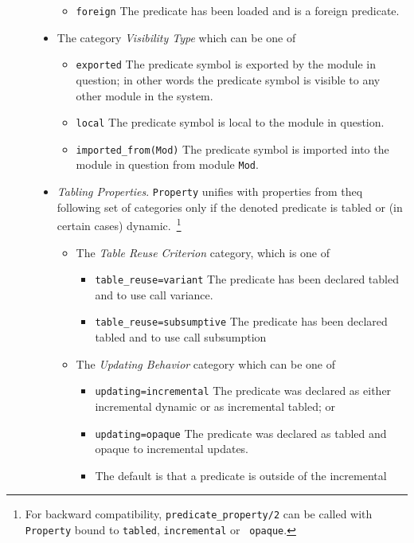 \begin{description}
\begin{itemize}
\begin{itemize}
\item{\tt foreign} The predicate has been loaded and is a foreign
  predicate.
%
\end{itemize}
%
\item The category {\em Visibility Type} which can be one of
\begin{itemize}
\item{\tt exported} The predicate symbol is exported by the module in
  question; in other words the predicate symbol is visible to any
  other module in the system.
%
\item{\tt local} The predicate symbol is local to the module in
  question.
%
\item{\tt imported\_from(Mod)} The predicate symbol is imported into
  the module in question from module {\tt Mod}.
%
\end{itemize}
\item{\em Tabling Properties}.  {\tt Property} unifies with properties
  from theq following set of categories only if the denoted predicate
  is tabled or (in certain cases) dynamic.~\footnote{For backward
    compatibility, {\tt predicate\_property/2} can be called with {\tt
      Property} bound to {\tt tabled}, {\tt incremental} or {\tt
      opaque}.}
%
\begin{itemize}
\item The {\em Table Reuse Criterion} category, which is one of 
\begin{itemize}
\item{\tt table\_reuse=variant} The predicate has been declared
  tabled and to use call variance.
%
\item{\tt table\_reuse=subsumptive} The predicate has been declared
  tabled and to use call subsumption
%
%
\end{itemize}
%
\item The {\em Updating Behavior} category which can be one of 
\begin{itemize}
\item{\tt updating=incremental} The predicate was declared as
  either incremental dynamic or as incremental tabled; or
%
\item{\tt updating=opaque} The predicate was declared as
  tabled and opaque to incremental updates.
%
\item The default is that a predicate is outside of the incremental

\end{itemize}
\end{itemize}
\end{itemize}
\end{description}
